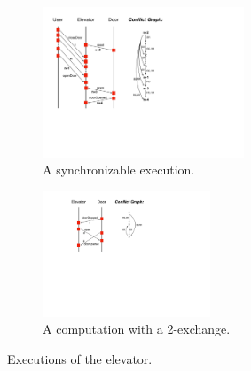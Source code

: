 \begin{figure}
\begin{subfigure}[t]{6cm}
\includegraphics[width=6cm]{MSC-elevator1.pdf}
\caption{A synchronizable execution.}
\label{fig:elevator-exec1}
\end{subfigure}
\hspace{1cm}
\begin{subfigure}[t]{5cm}
\includegraphics[width=5cm]{MSC-elevator2.pdf}
\caption{A computation with a 2-exchange.}
\label{fig:elevator-exec2}
\end{subfigure}
\caption{Executions of the elevator.}
\label{fig:elevator-exec}
\end{figure}

%


